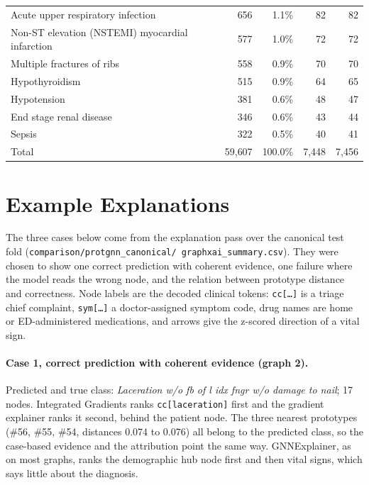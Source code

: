 \begin{table}[htbp]
\begin{tabular}{lrrrr}
    Acute upper respiratory infection & 656 & 1.1\% & 82 & 82 \\
    Non-ST elevation (NSTEMI) myocardial infarction & 577 & 1.0\% & 72 & 72 \\
    Multiple fractures of ribs & 558 & 0.9\% & 70 & 70 \\
    Hypothyroidism & 515 & 0.9\% & 64 & 65 \\
    Hypotension & 381 & 0.6\% & 48 & 47 \\
    End stage renal disease & 346 & 0.6\% & 43 & 44 \\
    Sepsis & 322 & 0.5\% & 40 & 41 \\
    \midrule
    Total & 59{,}607 & 100.0\% & 7{,}448 & 7{,}456 \\
    \bottomrule
  \end{tabular}
\end{table}

\section{Example Explanations}

The three cases below come from the explanation pass over the canonical test
fold (\texttt{comparison/\allowbreak protgnn\_canonical/\allowbreak
graphxai\_summary.csv}).  They were chosen to show one correct prediction with coherent evidence,
one failure where the model reads the wrong node, and the relation between
prototype distance and correctness. Node labels are the decoded
clinical tokens: \texttt{cc[\ldots]} is a triage chief complaint,
\texttt{sym[\ldots]} a doctor-assigned symptom code, drug names are home or
ED-administered medications, and arrows give the z-scored direction of a vital
sign.

\paragraph{Case 1, correct prediction with coherent evidence (graph 2).}
Predicted and true class: \emph{Laceration w/o fb of l idx fngr w/o damage to
nail}; 17 nodes. Integrated Gradients ranks \texttt{cc[laceration]} first and the
gradient explainer ranks it second, behind the patient node. The three nearest
prototypes (\#56, \#55, \#54, distances 0.074 to 0.076) all belong to the
predicted class, so the case-based evidence and the attribution point the same
way. GNNExplainer, as on most graphs, ranks the demographic hub node first and
then vital signs, which says little about the diagnosis.


